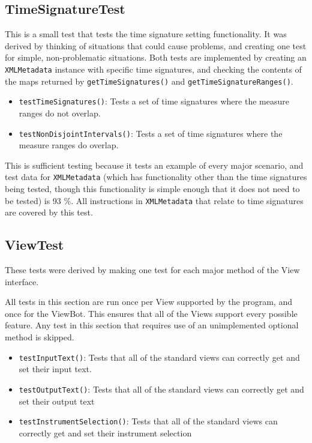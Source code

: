 \documentclass[11pt]{article}
\begin{document}
\subsection{TimeSignatureTest}
\label{sec:org78db87d}
This is a small test that tests the time signature setting functionality.  It was derived by thinking of situations that could cause problems, and creating one test for simple, non-problematic situations.  Both tests are implemented by creating an \texttt{XMLMetadata} instance with specific time signatures, and checking the contents of the maps returned by \texttt{getTimeSignatures()} and \texttt{getTimeSignatureRanges()}.
\begin{itemize}
\item \texttt{testTimeSignatures()}: Tests a set of time signatures where the measure ranges do not overlap.
\item \texttt{testNonDisjointIntervals()}: Tests a set of time signatures where the measure ranges do overlap.
\end{itemize}

This is sufficient testing because it tests an example of every major scenario, and test data for \texttt{XMLMetadata} (which has functionality other than the time signatures being tested, though this functionality is simple enough that it does not need to be tested) is 93 \%.  All instructions in \texttt{XMLMetadata} that relate to time signatures are covered by this test.
\subsection{ViewTest}
\label{sec:org09ce8d0}
These tests were derived by making one test for each major method of the View interface.

All tests in this section are run once per View supported by the program, and once for the ViewBot.  This ensures that all of the Views support every possible feature.  Any test in this section that requires use of an unimplemented optional method is skipped.  

\begin{itemize}
\item \texttt{testInputText()}: Tests that all of the standard views can correctly get and set their input text.
\item \texttt{testOutputText()}: Tests that all of the standard views can correctly get and set their output text
\item \texttt{testInstrumentSelection()}: Tests that all of the standard views can correctly get and set their instrument selection
\end{itemize}
\end{document}
